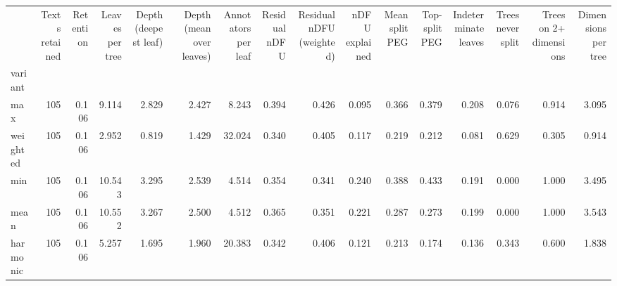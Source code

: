 \begin{tabular}{lrrrrrrrrrrrrrrr}
\toprule
 & Texts retained & Retention & Leaves per tree & Depth (deepest leaf) & Depth (mean over leaves) & Annotators per leaf & Residual nDFU & Residual nDFU (weighted) & nDFU explained & Mean split PEG & Top-split PEG & Indeterminate leaves & Trees never split & Trees on 2+ dimensions & Dimensions per tree \\
variant &  &  &  &  &  &  &  &  &  &  &  &  &  &  &  \\
\midrule
max & 105 & 0.106 & 9.114 & 2.829 & 2.427 & 8.243 & 0.394 & 0.426 & 0.095 & 0.366 & 0.379 & 0.208 & 0.076 & 0.914 & 3.095 \\
weighted & 105 & 0.106 & 2.952 & 0.819 & 1.429 & 32.024 & 0.340 & 0.405 & 0.117 & 0.219 & 0.212 & 0.081 & 0.629 & 0.305 & 0.914 \\
min & 105 & 0.106 & 10.543 & 3.295 & 2.539 & 4.514 & 0.354 & 0.341 & 0.240 & 0.388 & 0.433 & 0.191 & 0.000 & 1.000 & 3.495 \\
mean & 105 & 0.106 & 10.552 & 3.267 & 2.500 & 4.512 & 0.365 & 0.351 & 0.221 & 0.287 & 0.273 & 0.199 & 0.000 & 1.000 & 3.543 \\
harmonic & 105 & 0.106 & 5.257 & 1.695 & 1.960 & 20.383 & 0.342 & 0.406 & 0.121 & 0.213 & 0.174 & 0.136 & 0.343 & 0.600 & 1.838 \\
\bottomrule
\end{tabular}
